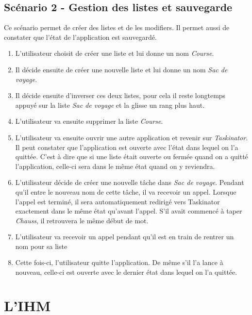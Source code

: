 \documentclass[a4paper,10pt]{article}
\begin{document}
\subsection{Scénario 2 - Gestion des listes et sauvegarde}
Ce scénario permet de créer des listes et de les modifiers. Il permet aussi de constater que l'état de l'application est sauvegardé.
\begin{enumerate}
\item{L'utilisateur choisit de créer une liste et lui donne un nom \textit{Course}.}
\item{Il décide ensuite de créer une nouvelle liste et lui donne un nom \textit{Sac de voyage}.}
\item{Il décide ensuite d'inverser ces deux listes, pour cela il reste longtemps appuyé sur la liste \textit{Sac de voyage} et la glisse un rang plus haut.}
\item{L'utilisateur va ensuite supprimer la liste \textit{Course}.}
\item{L'utilisateur va ensuite ouvrir une autre application et revenir sur \textit{Taskinator}. Il peut constater que l'application est ouverte avec l'état dans lequel on l'a quittée. C'est à dire que si une liste était ouverte ou fermée quand on a quitté l'application, celle-ci sera dans le même état quand on y reviendra.}
\item{L'utilisateur décide de créer une nouvelle tâche dans \textit{Sac de voyage}. Pendant qu'il entre le nouveau nom de cette tâche, il va recevoir un appel. Lorsque l'appel est terminé, il sera automatiquement redirigé vers Taskinator exactement dans le même état qu'avant l'appel. S'il avait commencé à taper \textit{Chauss}, il retrouvera le même début de mot.}
\item{L'utilisateur va recevoir un appel pendant qu'il est en train de rentrer un nom pour sa liste}
\item{Cette fois-ci, l'utilisateur quitte l'application. De même s'il l'a lance à nouveau, celle-ci est ouverte avec le dernier état dans lequel on l'a quittée.}
\end{enumerate}


\newpage
\section{L'IHM}
\end{document}
